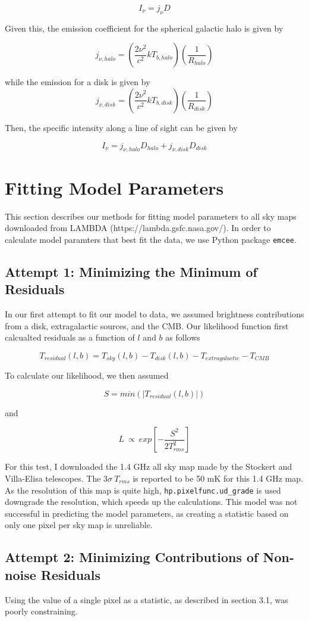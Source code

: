 \documentclass[letterpaper, 10pt]{article}
\begin{document}
\[ I_{\nu} = j_{\nu}D \]

Given this, the emission coefficient for the spherical galactic halo is given by 

\[j_{\nu, halo} = \left(\frac{2\nu^{2}}{c^{2}}kT_{b, halo}\right)\left(\frac{1}{R_{halo}}\right)\]

while the emission for a disk is given by 
\[j_{\nu, disk} = \left(\frac{2\nu^{2}}{c^{2}}kT_{b, disk}\right)\left(\frac{1}{R_{disk}}\right)\]

Then, the specific intensity along a line of sight can be given by 

\[I_{\nu} = j_{\nu, halo}D_{halo} + j_{\nu, disk}D_{disk} \]

\section{Fitting Model Parameters}
This section describes our methods for fitting model parameters to all sky maps downloaded from LAMBDA (https://lambda.gsfc.nasa.gov/). In order to calculate model paramters that best fit the data, we use Python package \texttt{emcee}. 

\subsection{Attempt 1: Minimizing the Minimum of Residuals}
In our first attempt to fit our model to data, we assumed brightness contributions from a disk, extragalactic sources, and the CMB. Our likelihood function first calcualted residuals as a function of $l$ and $b$ as follows

\[ T_{residual}(l,b) = T_{sky}(l,b) - T_{disk}(l,b) - T_{extragalactic} - T_{CMB} \]

To calculate our likelihood, we then assumed

\[ S = min\left(|T_{residual}(l,b)|\right) \] 

and 

\[ L\ \propto\ exp\left[-\frac{S^2}{2T_{rms}^2}\right] \]

For this test, I downloaded the 1.4 GHz all sky map made by the Stockert and Villa-Elisa telescopes. The $3\sigma\ T_{rms}$ is reported to be 50 mK for this 1.4 GHz map. As the resolution of this map is quite high, \texttt{hp.pixelfunc.ud\_grade} is used downgrade the resolution, which speeds up the calculations. This model was not successful in predicting the model parameters, as creating a statistic based on only one pixel per sky map is unreliable. 

\subsection{Attempt 2: Minimizing Contributions of Non-noise Residuals}
Using the value of a single pixel as a statistic, as described in section 3.1, was poorly constraining.
\end{document}
